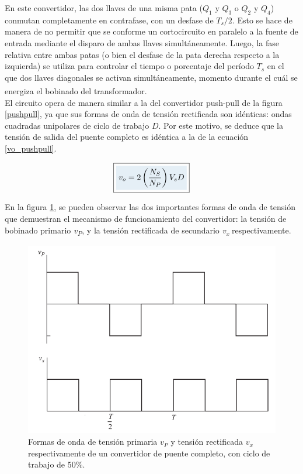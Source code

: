 En este convertidor, las dos llaves de una misma pata ($Q_1$ y $Q_3$ o $Q_2$ y $Q_4$) conmutan completamente en contrafase, con un desfase de $T_s/2$. Esto se hace de manera de no permitir que se conforme un cortocircuito en paralelo a la fuente de entrada mediante el disparo de ambas llaves simultáneamente. Luego, la fase relativa entre ambas patas (o bien el desfase de la pata derecha respecto a la izquierda) se utiliza para controlar el tiempo o porcentaje del período $T_s$ en el que dos llaves diagonales se activan simultáneamente, momento durante el cuál se energiza el bobinado del transformador.\textsuperscript{\cite{PaperFullBridge}}\\

El circuito opera de manera similar a la del convertidor push-pull de la figura \ref{pushpull}, ya que sus formas de onda de tensión rectificada son idénticas: ondas cuadradas unipolares de ciclo de trabajo $D$. Por este motivo, se deduce que la tensión de salida del puente completo es idéntica a la de la ecuación \ref{vo_pushpull}.

\begin{equation}\label{vo_fullbridge}
    \boxed{
        \highlight{v_o = 2\left(\frac{N_{S}}{N_{P}}\right)V_sD}
    }
\end{equation}

En la figura \ref{fullbridge-waveforms}, se pueden observar las dos importantes formas de onda de tensión que demuestran el mecanismo de funcionamiento del convertidor: la {\Medium tensión de bobinado primario \textit{v\textsubscript{P}}}, y la {\Medium tensión rectificada de secundario \textit{v\textsubscript{x}}} respectivamente.\\

\begin{figure}[h]
    \centering
    \includegraphics[scale=0.48]{Imagenes/Formas de onda Full-Bridge.png}
    \caption{Formas de onda de tensión primaria $v_P$ y tensión rectificada $v_x$ respectivamente de un convertidor de puente completo, con ciclo de trabajo de 50\%.}
    \label{fullbridge-waveforms}
\end{figure}

